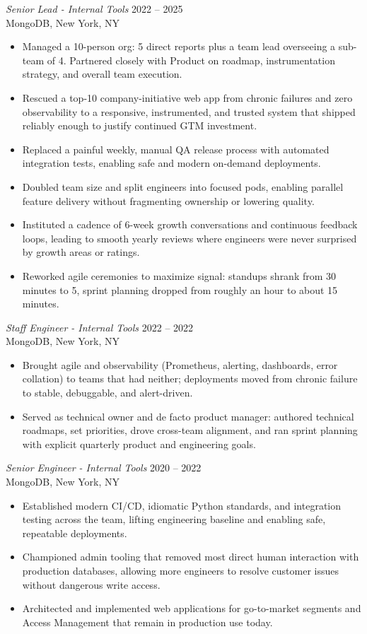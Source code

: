 \documentclass{res} %
\begin{document}
\begin{resume}
{\sl Senior Lead - Internal Tools} \hfill 2022 -- 2025 \\
MongoDB, New York, NY
\begin{itemize}
\item[-] Managed a 10-person org: 5 direct reports plus a team lead overseeing a sub-team of 4. Partnered closely with Product on roadmap, instrumentation strategy, and overall team execution.
\item[-] Rescued a top-10 company-initiative web app from chronic failures and zero observability to a responsive, instrumented, and trusted system that shipped reliably enough to justify continued GTM investment.
\item[-] Replaced a painful weekly, manual QA release process with automated integration tests, enabling safe and modern on-demand deployments.
\item[-] Doubled team size and split engineers into focused pods, enabling parallel feature delivery without fragmenting ownership or lowering quality.
\item[-] Instituted a cadence of 6-week growth conversations and continuous feedback loops, leading to smooth yearly reviews where engineers were never surprised by growth areas or ratings.
\item[-] Reworked agile ceremonies to maximize signal: standups shrank from 30 minutes to 5, sprint planning dropped from roughly an hour to about 15 minutes.
\end{itemize}

{\sl Staff Engineer - Internal Tools} \hfill 2022 -- 2022 \\
MongoDB, New York, NY
\begin{itemize}
\item[-] Brought agile and observability (Prometheus, alerting, dashboards, error collation) to teams that had neither; deployments moved from chronic failure to stable, debuggable, and alert-driven.
\item[-] Served as technical owner and de facto product manager: authored technical roadmaps, set priorities, drove cross-team alignment, and ran sprint planning with explicit quarterly product and engineering goals.
\end{itemize}

{\sl Senior Engineer - Internal Tools} \hfill 2020 -- 2022 \\
MongoDB, New York, NY
\begin{itemize}
\item[-] Established modern CI/CD, idiomatic Python standards, and integration testing across the team, lifting engineering baseline and enabling safe, repeatable deployments.
\item[-] Championed admin tooling that removed most direct human interaction with production databases, allowing more engineers to resolve customer issues without dangerous write access.
\item[-] Architected and implemented web applications for go-to-market segments and Access Management that remain in production use today.
\end{itemize}


\end{resume}
\end{document}
